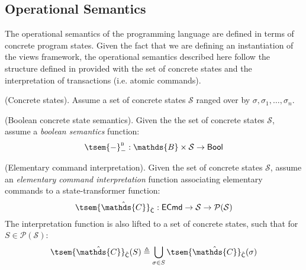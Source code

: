 \subsection{Operational Semantics}

The operational semantics of the programming language are defined in terms of concrete program states. Given the fact that we are defining an instantiation of the views framework, the operational semantics described here follow the structure defined in \cite{views} provided with the set of concrete states and the interpretation of transactions (i.e. atomic commands).

\begin{param}
	(Concrete states).
	Assume a set of concrete states $\mathcal{S}$ ranged over by $\sigma, \sigma_1, \ldots, \sigma_n$.
\end{param}

\begin{param}
	\label{param:boolConcrete}
	(Boolean concrete state semantics).
	Given the the set of concrete states $\mathcal{S}$, assume a \emph{boolean semantics} function:
	\[
		\tsem{-}^\textsc{b}_- : \mathds{B} \times \mathcal{S} \rightarrow \mathsf{Bool}
	\]	
\end{param}

\begin{param}
	\label{param:ecmdInt}
	(Elementary command interpretation).
	Given the set of concrete states $\mathcal{S}$, assume an \emph{elementary command interpretation} function associating elementary commands to a state-transformer function:
	\[
		\tsem{\hat{\mathds{C}}}_{\hat{\mathsf{C}}} : \mathsf{ECmd} \rightarrow \mathcal{S} \rightarrow \mathcal{P}(\mathcal{S})
	\]
	The interpretation function is also lifted to a set of concrete states, such that for $S \in \mathcal{P}(\mathcal{S})$:
	\[
		\tsem{\hat{\mathds{C}}}_{\hat{\mathsf{C}}}(S) \triangleq \bigcup_{\sigma \in S} \tsem{\hat{\mathds{C}}}_{\hat{\mathsf{C}}}(\sigma)
	\]
\end{param}

